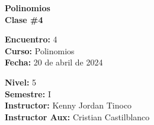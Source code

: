 \begin{center} \textbf
{
    \Large Polinomios\\ \vspace{2mm}Clase \#4
}
\end{center}

\begin{multicols}{2}
{
    \textbf{Encuentro:} 4\\
    \textbf{Curso:} Polinomios\\
    \textbf{Fecha:} 20 de abril de 2024\\
    \begin{flushright}
        \textbf{Nivel:} 5\\
        \textbf{Semestre:} I\\
        \textbf{Instructor:} Kenny Jordan Tinoco\\
        \textbf{Instructor Aux:} Cristian Castilblanco
    \end{flushright}
}
\end{multicols}

\thispagestyle{first-page-style}
